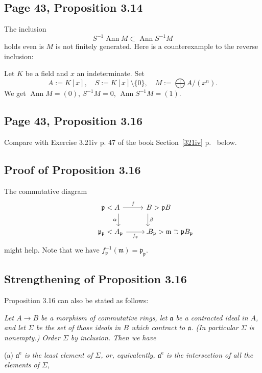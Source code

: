 \documentclass[parskip=half,fontsize=12pt]{scrartcl}%
\newcommand{\oo}{\operatorname}\newcommand{\ooo}{\operatorname*}
\newcommand{\mf}{\mathfrak}
\newcommand{\aaa}{\mf a}
\newcommand{\ppp}{\mf p}
\begin{document}
\subsection{Page 43, Proposition 3.14}%

The inclusion 
$$
S^{-1}\oo{Ann}M\subset\oo{Ann}S^{-1}M
$$ 
holds even is $M$ is not finitely generated. Here is a counterexample to the reverse inclusion:

Let $K$ be a field and $x$ an indeterminate. Set 
$$
A:=K[x],\quad S:=K[x]\setminus\{0\},\quad M:=\bigoplus A/(x^n).
$$ 
We get $\oo{Ann}M=(0)$, $S^{-1}M=0$, $\oo{Ann}S^{-1}M=(1)$. 

\subsection{Page 43, Proposition 3.16}%

Compare with Exercise 3.21iv p. 47 of the book Section~\ref{321iv} p.~\pageref{321iv} below.

\subsection{Proof of Proposition 3.16}

The commutative diagram
$$
\begin{tikzcd}
\kern-22pt\ppp<A\ar[d,"\alpha"']\ar[r,"f"]&B>\ppp B\ar[d,"\beta"]\kern-30pt\\ 
\kern-22pt\ppp_\ppp<A_\ppp\ar[r,"f_\ppp"']&B_\ppp>\mf m\supset\ppp B_\ppp\kern-66pt.
\end{tikzcd}
$$ 
might help. Note that we have $f_\ppp^{-1}(\mf m)=\ppp_\ppp$.


\subsection{Strengthening of Proposition 3.16}\label{43}

Proposition 3.16 can also be stated as follows:

\emph{Let $A\to B$ be a morphism of commutative rings, let $\aaa$ be a contracted ideal in $A$, and let $\Sigma$ be the set of those ideals in $B$ which contract to $\aaa$. (In particular $\Sigma$ is nonempty.) Order $\Sigma$ by inclusion. Then we have}

(a) \emph{$\aaa^{\oo e}$ is the least element of $\Sigma$, or, equivalently, $\aaa^{\oo e}$ is the intersection of all the elements of $\Sigma$,}
\end{document}
